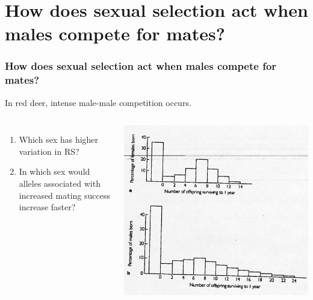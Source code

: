 \section[How does sexual selection act when males compete for mates?]{How does
    sexual selection act when males compete for mates?}

\begin{noheadline}
\begin{frame}[t]
    \frametitle{How does sexual selection act when males compete for mates?}
    \begin{adjustwidth}{-2em}{-1.5em}
        \vspace{-2mm}
        In red deer, intense male-male competition occurs.

        \begin{columns}[t]


        \begin{enumerate}
            \item Which sex has higher variation in RS?


            \item In which sex would alleles associated with increased mating
                success increase faster?

        \end{enumerate}


        \includegraphics[width=\columnwidth]{deer-rs.jpg}

        \end{columns}
    \end{adjustwidth}
\end{frame}
\end{noheadline}

